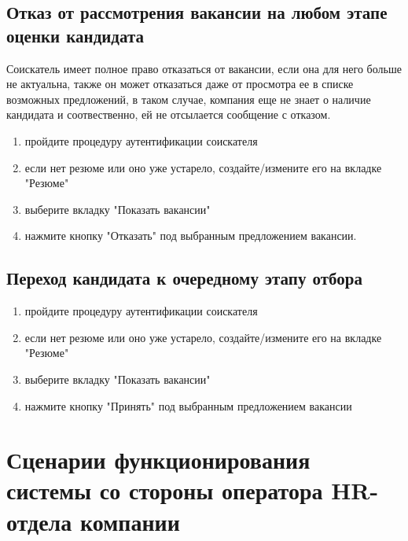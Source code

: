 \subsection{Отказ от рассмотрения вакансии на любом этапе оценки кандидата}
Соискатель имеет полное право отказаться от вакансии, если она для него больше не актуальна, также он может отказаться даже от просмотра ее в списке возможных предложений, в таком случае, компания еще не знает о наличие кандидата и соотвественно, ей не отсылается сообщение с отказом.
\begin{enumerate}
\item пройдите процедуру аутентификации соискателя
\item если нет резюме или оно уже устарело, создайте/измените его на вкладке "Резюме"
\item выберите вкладку "Показать вакансии"
\item нажмите кнопку "Отказать" под выбранным предложением вакансии. 
\end{enumerate}
\subsection{Переход кандидата к очередному этапу отбора}
\begin{enumerate}
\item пройдите процедуру аутентификации соискателя
\item если нет резюме или оно уже устарело, создайте/измените его на вкладке "Резюме"
\item выберите вкладку "Показать вакансии"
\item нажмите кнопку "Принять" под выбранным предложением вакансии
\end{enumerate}

\section{Сценарии функционирования системы со стороны оператора HR-отдела компании}

